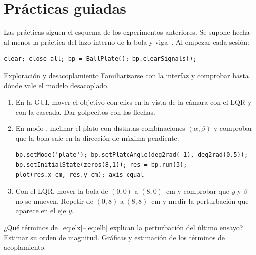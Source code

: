 \chapter{Prácticas guiadas}
\label{cap:practicas}

Las prácticas siguen el esquema de los experimentos anteriores. Se supone hecha al menos la práctica del lazo interno de la bola y viga~\cite{viga}. Al empezar cada sesión:
\begin{lstlisting}
clear; close all; bp = BallPlate(); bp.clearSignals();
\end{lstlisting}

\label{pr:explora}
\begin{practica}{Exploración y desacoplamiento}
\objetivos Familiarizarse con la interfaz y comprobar hasta dónde vale el modelo desacoplado.
\procedimiento
\begin{enumerate}
  \item En la GUI, mover el objetivo con clics en la vista de la cámara con el LQR y con la cascada. Dar golpecitos con las flechas.
  \item En modo , inclinar el plato con distintas combinaciones $(\alpha,\beta)$ y comprobar que la bola sale en la dirección de máxima pendiente:
\begin{lstlisting}
bp.setMode('plate'); bp.setPlateAngle(deg2rad(-1), deg2rad(0.5));
bp.setInitialState(zeros(8,1)); res = bp.run(3);
plot(res.x_cm, res.y_cm); axis equal
\end{lstlisting}
  \item Con el LQR, mover la bola de $(0,0)$ a $(8,0)$~cm y comprobar que $y$ y $\beta$ no se mueven. Repetir de $(0,8)$ a $(8,8)$~cm y medir la perturbación que aparece en el eje $y$.
\end{enumerate}
\preguntas ¿Qué términos de~\eqref{eq:elx}--\eqref{eq:elb} explican la perturbación del último ensayo? Estimar su orden de magnitud.
\entregables Gráficas y estimación de los términos de acoplamiento.
\end{practica}

